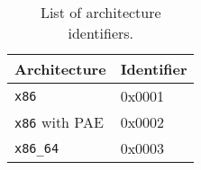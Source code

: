 \documentclass[a4paper,oneside]{memoir}
\begin{document}
\begin{table}
    \centering
    \begin{tabular}{ l l }
        \hline
            Architecture          & Identifier  \\ \hline
            \texttt{x86}          & 0x0001      \\
            \texttt{x86} with PAE & 0x0002      \\
            \texttt{x86\_64}      & 0x0003      \\
        \hline
    \end{tabular}
    \caption{List of architecture identifiers. \label{tab:Arch identifiers}}
\end{table}
\end{document}
